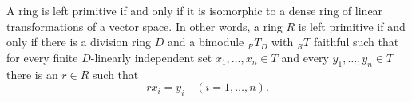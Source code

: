 A ring is left primitive if and only if it is isomorphic to a dense ring of linear transformations of a vector space. In other words, a ring $R$ is left primitive if and only if there is a division ring $D$ and a bimodule ${}_R T_D$ with ${}_R T$ faithful such that for every finite $D$-linearly independent set $x_1, \ldots, x_n \in T$ and every $y_1, \ldots, y_n \in T$ there is an $r \in R$ such that
$$r x_i = y_i \quad (i = 1, \ldots, n).$$
